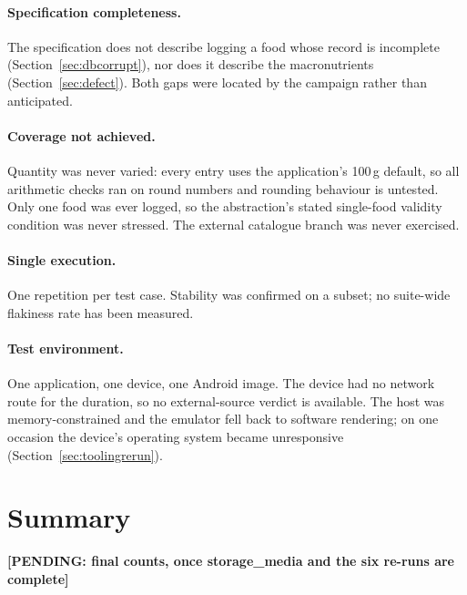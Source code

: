 \documentclass[11pt,a4paper]{article}
\newcommand{\PENDING}[1]{\textcolor{warn}{\textbf{[PENDING: #1]}}}
\begin{document}
\paragraph{Specification completeness.}
The specification does not describe logging a food whose record is incomplete
(Section~\ref{sec:dbcorrupt}), nor does it describe the macronutrients
(Section~\ref{sec:defect}). Both gaps were located by the campaign rather than
anticipated.

\paragraph{Coverage not achieved.}
Quantity was never varied: every entry uses the application's 100\,g default, so
all arithmetic checks ran on round numbers and rounding behaviour is untested.
Only one food was ever logged, so the abstraction's stated single-food validity
condition was never stressed. The external catalogue branch was never exercised.

\paragraph{Single execution.}
One repetition per test case. Stability was confirmed on a subset; no suite-wide
flakiness rate has been measured.

\paragraph{Test environment.}
One application, one device, one Android image. The device had no network route
for the duration, so no external-source verdict is available. The host was
memory-constrained and the emulator fell back to software rendering; on one
occasion the device's operating system became unresponsive
(Section~\ref{sec:toolingrerun}).

\section{Summary}

\PENDING{final counts, once storage\_media and the six re-runs are complete}
\end{document}
